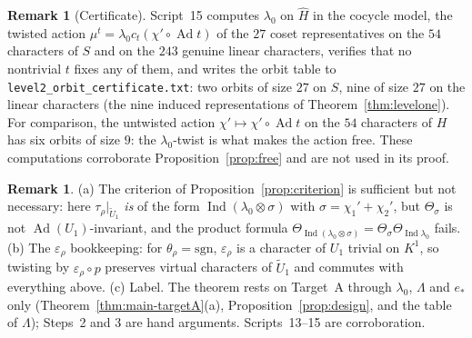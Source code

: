 \documentclass[11pt]{article}
\newcommand{\Ind}{\operatorname{Ind}}
\newcommand{\Ad}{\operatorname{Ad}}
\newcommand{\tU}{\widetilde U}
\theoremstyle{plain}
\theoremstyle{definition}
\newtheorem{remark}[theorem]{Remark}
\begin{document}
\begin{remark}[Certificate]
Script~15 computes $\lambda_0$ on $\hat H$ in the cocycle model, the
twisted action $\mu^t=\lambda_0c_t(\chi'\circ\Ad t)$ of the $27$ coset
representatives on the $54$ characters of $S$ and on the $243$ genuine
linear characters, verifies that no nontrivial $t$ fixes any of them,
and writes the orbit table to \texttt{level2\_orbit\_certificate.txt}:
two orbits of size $27$ on $S$, nine of size $27$ on the linear
characters (the nine induced representations of
Theorem~\ref{thm:levelone}).  For comparison, the untwisted action
$\chi'\mapsto\chi'\circ\Ad t$ on the $54$ characters of $H$ has six
orbits of size $9$: the $\lambda_0$-twist is what makes the action free.
These computations corroborate Proposition~\ref{prop:free} and are not
used in its proof.
\end{remark}

\begin{remark}
(a) The criterion of Proposition~\ref{prop:criterion} is sufficient but
not necessary: here $\tau_\rho|_{\tU_1}$ \emph{is} of the form
$\Ind(\lambda_0\otimes\sigma)$ with $\sigma=\chi_1'+\chi_2'$, but
$\Theta_\sigma$ is not $\Ad(U_1)$-invariant, and the product formula
$\Theta_{\Ind(\lambda_0\otimes\sigma)}=\Theta_\sigma\Theta_{\Ind\lambda_0}$
fails.
(b) The $\varepsilon_\rho$ bookkeeping: for $\theta_\rho=\mathrm{sgn}$,
$\varepsilon_\rho$ is a character of $U_1$ trivial on $K^1$, so twisting
by $\varepsilon_\rho\circ p$ preserves virtual characters of $\tU_1$ and
commutes with everything above.
(c) Label.  The theorem rests on Target~A through $\lambda_0$, $\Lambda$
and $e_*$ only (Theorem~\ref{thm:main-targetA}(a),
Proposition~\ref{prop:design}, and the table of $\Lambda$); Steps~2 and
3 are hand arguments.  Scripts~13--15 are corroboration.
\end{remark}
\end{document}
